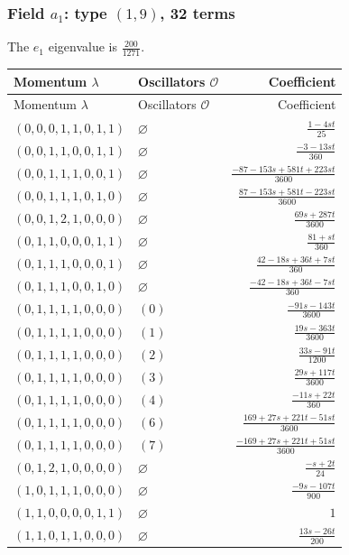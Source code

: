 \subsubsection{\texorpdfstring{Field $a_{1}$: type $(1,9)$, 32 terms}{Field a1: type (1,9), 32 terms}}
The $e_1$ eigenvalue is $\frac{200}{1271}$. 
\begingroup\scriptsize\setlength{\tabcolsep}{3pt}\renewcommand{\arraystretch}{1.35}
\begin{longtable}{@{}llr@{}}
\toprule Momentum $\lambda$&Oscillators $\mathcal O$&Coefficient\\\midrule\endfirsthead
\toprule Momentum $\lambda$&Oscillators $\mathcal O$&Coefficient\\\midrule\endhead
\bottomrule\endfoot
$(0,0,0,1,1,0,1,1)$ & $\varnothing$ & $\frac{1-4st}{25}$\\
$(0,0,1,1,0,0,1,1)$ & $\varnothing$ & $\frac{-3-13st}{360}$\\
$(0,0,1,1,1,0,0,1)$ & $\varnothing$ & $\frac{-87-153s+581t+223st}{3600}$\\
$(0,0,1,1,1,0,1,0)$ & $\varnothing$ & $\frac{87-153s+581t-223st}{3600}$\\
$(0,0,1,2,1,0,0,0)$ & $\varnothing$ & $\frac{69s+287t}{3600}$\\
$(0,1,1,0,0,0,1,1)$ & $\varnothing$ & $\frac{81+st}{360}$\\
$(0,1,1,1,0,0,0,1)$ & $\varnothing$ & $\frac{42-18s+36t+7st}{360}$\\
$(0,1,1,1,0,0,1,0)$ & $\varnothing$ & $\frac{-42-18s+36t-7st}{360}$\\
$(0,1,1,1,1,0,0,0)$ & $(0)$ & $\frac{-91s-143t}{3600}$\\
$(0,1,1,1,1,0,0,0)$ & $(1)$ & $\frac{19s-363t}{3600}$\\
$(0,1,1,1,1,0,0,0)$ & $(2)$ & $\frac{33s-91t}{1200}$\\
$(0,1,1,1,1,0,0,0)$ & $(3)$ & $\frac{29s+117t}{3600}$\\
$(0,1,1,1,1,0,0,0)$ & $(4)$ & $\frac{-11s+22t}{360}$\\
$(0,1,1,1,1,0,0,0)$ & $(6)$ & $\frac{169+27s+221t-51st}{3600}$\\
$(0,1,1,1,1,0,0,0)$ & $(7)$ & $\frac{-169+27s+221t+51st}{3600}$\\
$(0,1,2,1,0,0,0,0)$ & $\varnothing$ & $\frac{-s+2t}{24}$\\
$(1,0,1,1,1,0,0,0)$ & $\varnothing$ & $\frac{-9s-107t}{900}$\\
$(1,1,0,0,0,0,1,1)$ & $\varnothing$ & $1$\\
$(1,1,0,1,1,0,0,0)$ & $\varnothing$ & $\frac{13s-26t}{200}$\\

\end{longtable}
